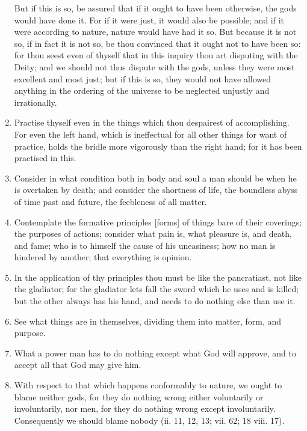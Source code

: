 \begin{enumerate}
But if this is so, be assured that if it ought to have been otherwise, the gods would have done it. For if it were just, it would also be possible; and if it were according to nature, nature would have had it so. But because it is not so, if in fact it is not so, be thou convinced that it ought not to have been so: for thou seest even of thyself that in this inquiry thou art disputing with the Deity; and we should not thus dispute with the gods, unless they were most excellent and most just; but if this is so, they would not have allowed anything in the ordering of the universe to be neglected unjustly and irrationally.

\item Practise thyself even in the things which thou despairest of accomplishing. For even the left hand, which is ineffectual for all other things for want of practice, holds the bridle more vigorously than the right hand; for it has been practised in this.

\item Consider in what condition both in body and soul a man should be when he is overtaken by death; and consider the shortness of life, the boundless abyss of time past and future, the feebleness of all matter.

\item Contemplate the formative principles [{\clarify forms}] of things bare of their coverings; the purposes of actions; consider what pain is, what pleasure is, and death, and fame; who is to himself the cause of his uneasiness; how no man is hindered by another; that everything is opinion.

\item In the application of thy principles thou must be like the pancratiast, not like the gladiator; for the gladiator lets fall the sword which he uses and is killed; but the other always has his hand, and needs to do nothing else than use it.

\item See what things are in themselves, dividing them into matter, form, and purpose.

\item What a power man has to do nothing except what God will approve, and to accept all that God may give him.

\item With respect to that which happens conformably to nature, we ought to blame neither gods, for they do nothing wrong either voluntarily or involuntarily, nor men, for they do nothing wrong except involuntarily. Consequently we should blame nobody (ii. 11, 12, 13; vii. 62; 18 viii. 17).


\end{enumerate}

